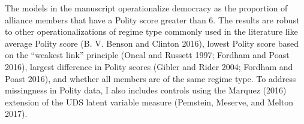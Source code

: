 \documentclass[
  letterpaper,
  DIV=11,
  numbers=noendperiod]{scrartcl}
\begin{document}
The models in the manuscript operationalize democracy as the proportion
of alliance members that have a Polity score greater than 6. The results
are robust to other operationalizations of regime type commonly used in
the literature like average Polity score (B. V. Benson and Clinton
2016), lowest Polity score based on the ``weakest link'' principle
(Oneal and Russett 1997; Fordham and Poast 2016), largest difference in
Polity scores (Gibler and Rider 2004; Fordham and Poast 2016), and
whether all members are of the same regime type. To address missingness
in Polity data, I also includes controls using the Marquez (2016)
extension of the UDS latent variable measure (Pemstein, Meserve, and
Melton 2017).

\begin{table}

\caption{\label{tbl-altdemo}Coefficient estimates with alternate
democracy variables.}

\centering{

}
\end{table}
\end{document}
